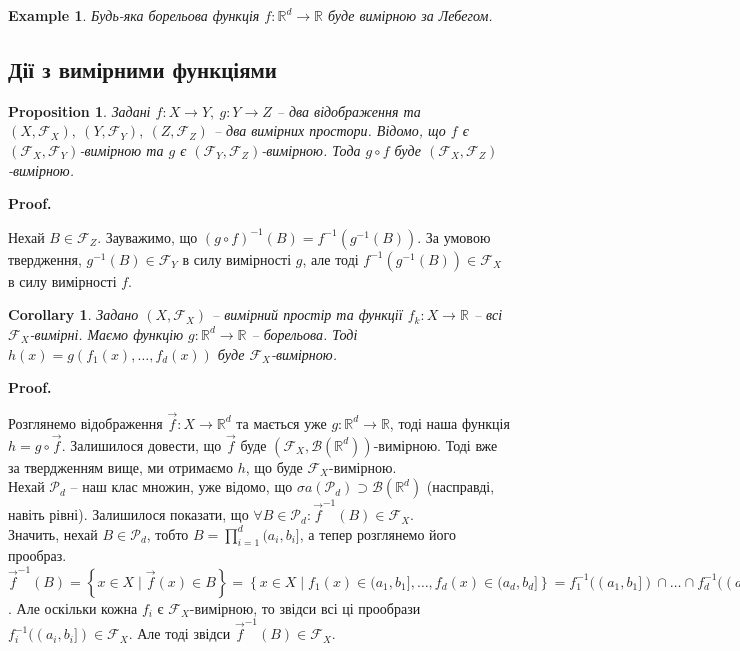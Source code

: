 \documentclass[a4paper, 10pt]{article}
\makeatletter
\theoremstyle{theoremdd}
\newtheorem{example}[theorem]{Example}
\newtheorem{proposition}[theorem]{Proposition}
\newtheorem{corollary}[theorem]{Corollary}
\renewenvironment{proof}[1][Proof.\\]{\par
\pushQED{\hfill \qed}%
\normalfont \topsep6\p@\@plus6\p@\relax
\trivlist
\item\relax
{\bfseries
#1\@addpunct{.}}\hspace\labelsep\ignorespaces
}{%
\popQED\endtrivlist\@endpefalse
}
\makeatother
\begin{document}
\begin{example}
Будь-яка борельова функція $f \colon \mathbb{R}^d \to \mathbb{R}$ буде вимірною за Лебегом.
\end{example}

\subsection{Дії з вимірними функціями}
\begin{proposition}
Задані $f \colon X \to Y,\ g \colon Y \to Z$ -- два відображення та $(X,\mathcal{F}_X),\ (Y,\mathcal{F}_Y),\ (Z,\mathcal{F}_Z)$ -- два вимірних простори. Відомо, що $f$ є $(\mathcal{F}_X,\mathcal{F}_Y)$-вимірною та $g$ є $(\mathcal{F}_Y,\mathcal{F}_Z)$-вимірною. Тода $g \circ f$ буде $(\mathcal{F}_X,\mathcal{F}_Z)$-вимірною.
\end{proposition}

\begin{proof}
Нехай $B \in \mathcal{F}_Z$. Зауважимо, що $(g \circ f)^{-1}(B) = f^{-1}(g^{-1}(B))$. За умовою твердження, $g^{-1}(B) \in \mathcal{F}_Y$ в силу вимірності $g$, але тоді $f^{-1}(g^{-1}(B)) \in \mathcal{F}_X$ в силу вимірності $f$.
\end{proof}

\begin{corollary}
Задано $(X,\mathcal{F}_X)$ -- вимірний простір та функції $f_k \colon X \to \mathbb{R}$ -- всі $\mathcal{F}_X$-вимірні. Маємо функцію $g \colon \mathbb{R}^d \to \mathbb{R}$ -- борельова. Тоді $h(x) = g(f_1(x),\dots,f_d(x))$ буде $\mathcal{F}_X$-вимірною.
\end{corollary}

\begin{proof}
Розглянемо відображення $\vec{f} \colon X \to \mathbb{R}^d$ та мається уже $g \colon \mathbb{R}^d \to \mathbb{R}$, тоді наша функція $h = g \circ \vec{f}$. Залишилося довести, що $\vec{f}$ буде $(\mathcal{F}_X,\mathcal{B}(\mathbb{R}^d))$-вимірною. Тоді вже за твердженням вище, ми отримаємо $h$, що буде $\mathcal{F}_X$-вимірною.\\
Нехай $\mathcal{P}_d$ -- наш клас множин, уже відомо, що $\sigma a(\mathcal{P}_d) \supset \mathcal{B}(\mathbb{R}^d)$ (насправді, навіть рівні). Залишилося показати, що $\forall B \in \mathcal{P}_d: \vec{f}^{-1}(B) \in \mathcal{F}_X$.\\
Значить, нехай $B \in \mathcal{P}_d$, тобто $B = \displaystyle\prod_{i=1}^d (a_i,b_i]$, а тепер розглянемо його прообраз.\\
$\vec{f}^{-1}(B) = \left\{ x \in X \mid \vec{f}(x) \in B \right\} = \left\{ x \in X \mid f_1(x) \in (a_1,b_1], \dots, f_d(x) \in (a_d,b_d] \right\} = f_1^{-1}((a_1,b_1]) \cap \dots \cap f_d^{-1}((a_d,b_d])$. Але оскільки кожна $f_i$ є $\mathcal{F}_X$-вимірною, то звідси всі ці прообрази $f_i^{-1}((a_i,b_i]) \in \mathcal{F}_X$. Але тоді звідси $\vec{f}^{-1}(B) \in \mathcal{F}_X$.
\end{proof}
\end{document}
